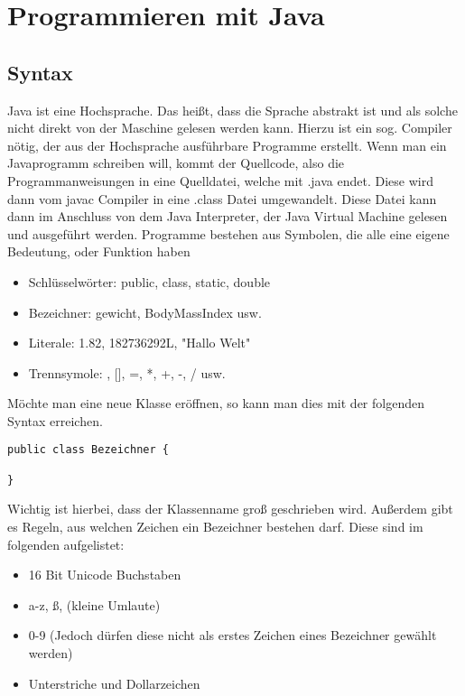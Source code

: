 
\chapter{Programmieren mit Java}

\ifpdf
    \graphicspath{{Chapter2/Figs/Raster/}{Chapter2/Figs/PDF/}{Chapter2/Figs/}}
\else
    \graphicspath{{Chapter2/Figs/Vector/}{Chapter2/Figs/}}
\fi


\section{Syntax}

Java ist eine Hochsprache. Das heißt, dass die Sprache abstrakt ist und als solche nicht direkt von der Maschine gelesen werden kann. Hierzu ist ein sog. Compiler nötig, der aus der Hochsprache ausführbare Programme erstellt. Wenn man ein Javaprogramm schreiben will, kommt der Quellcode, also die Programmanweisungen in eine Quelldatei, welche mit .java endet. Diese wird dann vom javac Compiler in eine .class Datei umgewandelt. Diese Datei kann dann im Anschluss von dem Java Interpreter, der Java Virtual Machine gelesen und ausgeführt werden.
Programme bestehen aus Symbolen, die alle eine eigene Bedeutung, oder Funktion haben
\begin{itemize}
\item Schlüsselwörter: public, class, static, double
\item Bezeichner: gewicht, BodyMassIndex usw.
\item Literale: 1.82, 182736292L, "Hallo Welt"
\item Trennsymole: {}, [], =, *, +, -, / usw.
\end{itemize}

Möchte man eine neue Klasse eröffnen, so kann man dies mit der folgenden Syntax erreichen.

\begin{verbatim}
public class Bezeichner {
	
}
\end{verbatim}

Wichtig ist hierbei, dass der Klassenname groß geschrieben wird. Außerdem gibt es Regeln, aus welchen Zeichen ein Bezeichner bestehen darf. Diese sind im folgenden aufgelistet:
\begin{itemize}
\item 16 Bit Unicode Buchstaben
\item a-z, ß, (kleine Umlaute)
\item 0-9 (Jedoch dürfen diese nicht als erstes Zeichen eines Bezeichner gewählt werden)
\item Unterstriche und Dollarzeichen
\end{itemize}

